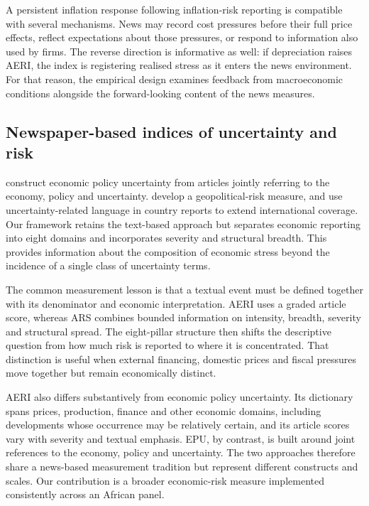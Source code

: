 \documentclass[12pt]{article}
\begin{document}
A persistent inflation response following inflation-risk reporting is compatible with several mechanisms. News may record cost pressures before their full price effects, reflect expectations about those pressures, or respond to information also used by firms. The reverse direction is informative as well: if depreciation raises AERI, the index is registering realised stress as it enters the news environment. For that reason, the empirical design examines feedback from macroeconomic conditions alongside the forward-looking content of the news measures.
\subsection{Newspaper-based indices of uncertainty and risk}
\citet{baker2016} construct economic policy uncertainty from articles jointly referring to the economy, policy and uncertainty. \citet{caldara2022} develop a geopolitical-risk measure, and \citet{ahir2022} use uncertainty-related language in country reports to extend international coverage. Our framework retains the text-based approach but separates economic reporting into eight domains and incorporates severity and structural breadth. This provides information about the composition of economic stress beyond the incidence of a single class of uncertainty terms.

The common measurement lesson is that a textual event must be defined together with its denominator and economic interpretation. AERI uses a graded article score, whereas ARS combines bounded information on intensity, breadth, severity and structural spread. The eight-pillar structure then shifts the descriptive question from how much risk is reported to where it is concentrated. That distinction is useful when external financing, domestic prices and fiscal pressures move together but remain economically distinct.

AERI also differs substantively from economic policy uncertainty. Its dictionary spans prices, production, finance and other economic domains, including developments whose occurrence may be relatively certain, and its article scores vary with severity and textual emphasis. EPU, by contrast, is built around joint references to the economy, policy and uncertainty. The two approaches therefore share a news-based measurement tradition but represent different constructs and scales. Our contribution is a broader economic-risk measure implemented consistently across an African panel.
\end{document}
